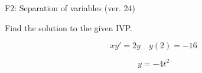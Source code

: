 \begin{exercise}
  \begin{exerciseTitle}F2: Separation of variables (ver. 24)\end{exerciseTitle}
  \begin{exerciseStatement}
    
Find the solution to the given IVP.

    
\[xy'= 2 y \hspace{1em} y( 2 ) = -16\]

  \end{exerciseStatement}
  \begin{exerciseAnswer}
    
\[y= -4 t^ 2\]

  \end{exerciseAnswer}
\end{exercise}